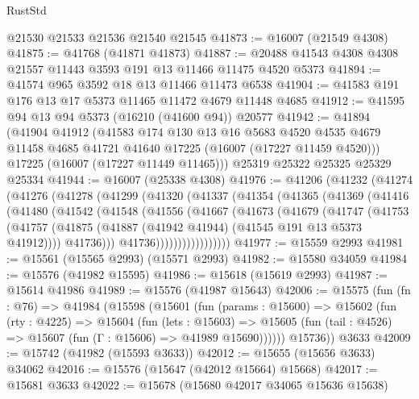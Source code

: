 \begin{lexlean}{RustStd}
\begin{coremodule}
    @21530
    @21533
    @21536
    @21540
    @21545
@41873 := @16007 (@21549 @4308)
@41875 := @41768 (@41871 @41873)
@41887 := @20488 @41543 @4308 @4308 @21557 @11443 @3593 @191 @13 @11466 @11475 @4520 @5373
@41894 := @41574 @965 @3592 @18 @13 @11466 @11473 @6538
@41904 := @41583 @191 @176 @13 @17 @5373 @11465 @11472 @4679 @11448 @4685
@41912 := @41595 @94 @13 @94 @5373 (@16210 (@41600 @94)) @20577
@41942 := @41894
    (@41904
      @41912
      (@41583
        @174
        @130
        @13
        @16
        @5683
        @4520
        @4535
        @4679
        @11458
        @4685
        @41721
        @41640
        @17225
        (@16007 (@17227 @11459 @4520)))
      @17225
      (@16007 (@17227 @11449 @11465)))
    @25319
    @25322
    @25325
    @25329
    @25334
@41944 := @16007 (@25338 @4308)
@41976 := @41206
    (@41232
      (@41274
        (@41276
          (@41278
            (@41299
              (@41320
                (@41337
                  (@41354
                    (@41365
                      (@41369
                        (@41416
                          (@41480
                            (@41542
                              (@41548
                                (@41556
                                  (@41667
                                    (@41673
                                      (@41679
                                        (@41747
                                          (@41753
                                            (@41757
                                              (@41875
                                                (@41887
                                                  (@41942 @41944)
                                                  (@41545 @191 @13 @5373 @41912))))
                                            @41736)))
                                      @41736)))))))))))))))))
@41977 := @15559 @2993
@41981 := @15561 (@15565 @2993) (@15571 @2993)
@41982 := @15580 @34059
@41984 := @15576 (@41982 @15595)
@41986 := @15618 (@15619 @2993)
@41987 := @15614 @41986
@41989 := @15576 (@41987 @15643)
@42006 := @15575
    (fun (fn : @76) =>
    @41984
      (@15598
        (@15601
          (fun (params : @15600) =>
          @15602
            (fun (rty : @4225) =>
            @15604
              (fun (lets : @15603) =>
              @15605 (fun (tail : @4526) => @15607 (fun (Γ : @15606) => @41989 @15690))))))
        @15736))
    @3633
@42009 := @15742 (@41982 (@15593 @3633))
@42012 := @15655 (@15656 @3633) @34062
@42016 := @15576 (@15647 (@42012 @15664) @15668)
@42017 := @15681 @3633
@42022 := @15678 (@15680 @42017 @34065 @15636 @15638)

\end{coremodule}
\end{lexlean}
